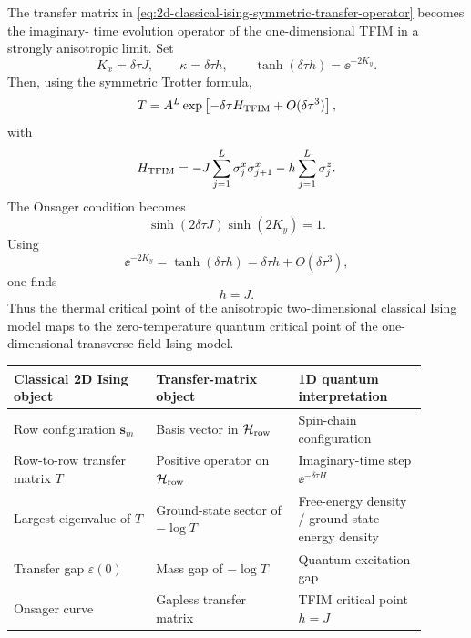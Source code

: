 The transfer matrix in
\cref{eq:2d-classical-ising-symmetric-transfer-operator} becomes the imaginary-
time evolution operator of the one-dimensional TFIM in a strongly anisotropic
limit.  Set
\begin{equation}
\label{eq:2d-classical-ising-tfim-scaling}
    K_x=\delta\tau J,
    \qquad
    \kappa=\delta\tau h,
    \qquad
    \tanh(\delta\tau h)=\ee^{-2K_y} .
\end{equation}
Then, using the symmetric Trotter formula,
\begin{equation}
\label{eq:2d-classical-ising-tfim-transfer-limit}
    T
    =
    A^L\exp\left[-\delta\tau H_{\rm TFIM}+O(\delta\tau^3)\right],
\end{equation}
with
\begin{equation}
\label{eq:2d-classical-ising-tfim-hamiltonian}
    H_{\rm TFIM}
    =
    -J\sum_{j=1}^{L}\sigma_j^x\sigma_{j+1}^x
    -h\sum_{j=1}^{L}\sigma_j^z .
\end{equation}
The Onsager condition becomes
\begin{equation}
    \sinh(2\delta\tau J)\sinh(2K_y)=1.
\end{equation}
Using
\begin{equation}
    \ee^{-2K_y}=\tanh(\delta\tau h)
    =
    \delta\tau h+O(\delta\tau^3),
\end{equation}
one finds
\begin{equation}
\label{eq:2d-classical-ising-tfim-critical-limit}
    h=J .
\end{equation}
Thus the thermal critical point of the anisotropic two-dimensional classical
Ising model maps to the zero-temperature quantum critical point of the
one-dimensional transverse-field Ising model.

\begin{center}
\begin{tabular}{@{}L{0.31\linewidth}L{0.31\linewidth}L{0.28\linewidth}@{}}
\toprule
Classical 2D Ising object & Transfer-matrix object & 1D quantum interpretation \\
\midrule
Row configuration $\bm{s}_m$ & Basis vector in $\mathcal{H}_{\rm row}$ & Spin-chain configuration \\
Row-to-row transfer matrix $T$ & Positive operator on $\mathcal{H}_{\rm row}$ & Imaginary-time step $\ee^{-\delta\tau H}$ \\
Largest eigenvalue of $T$ & Ground-state sector of $-\log T$ & Free-energy density / ground-state energy density \\
Transfer gap $\varepsilon(0)$ & Mass gap of $-\log T$ & Quantum excitation gap \\
Onsager curve & Gapless transfer matrix & TFIM critical point $h=J$ \\
\bottomrule
\end{tabular}
\end{center}

